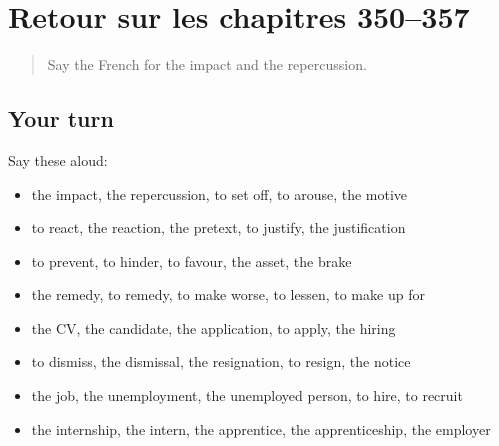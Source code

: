 \section[(dialogue)]{Retour sur les chapitres 350–357}

\label{lesson:FR-R357-revision-350-357}



\begin{quote}
Say the French for the impact and the repercussion.
\end{quote}

\subsection*{Your turn}
Say these aloud:

\begin{itemize}
\raggedright
  \item the impact, the repercussion, to set off, to arouse, the motive
  \item to react, the reaction, the pretext, to justify, the justification
  \item to prevent, to hinder, to favour, the asset, the brake
  \item the remedy, to remedy, to make worse, to lessen, to make up for
  \item the CV, the candidate, the application, to apply, the hiring
  \item to dismiss, the dismissal, the resignation, to resign, the notice
  \item the job, the unemployment, the unemployed person, to hire, to recruit
  \item the internship, the intern, the apprentice, the apprenticeship, the employer
\end{itemize}

